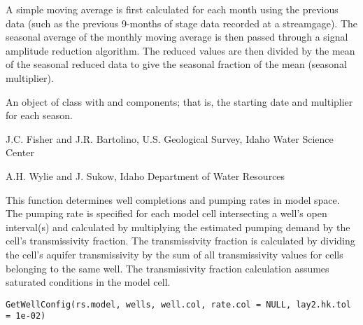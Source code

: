 \documentclass[a4paper]{book}
\begin{document}
%
\begin{Details}\relax
A simple moving average is first calculated for each month using the previous data (such as the previous 9-months of stage data recorded at a streamgage).
The seasonal average of the monthly moving average is then passed through a signal amplitude reduction algorithm.
The reduced values are then divided by the mean of the seasonal reduced data to give the seasonal fraction of the mean (seasonal multiplier).
\end{Details}
%
\begin{Value}
An object of  class with  and  components; that is, the starting date and multiplier for each season.
\end{Value}
%
\begin{Author}\relax
J.C. Fisher and J.R. Bartolino, U.S. Geological Survey, Idaho Water Science Center

A.H. Wylie and J. Sukow, Idaho Department of Water Resources
\end{Author}
%
\begin{Examples}
\end{Examples}
%
\begin{Description}\relax
This function determines well completions and pumping rates in model space.
The pumping rate is specified for each model cell intersecting a well's open interval(s)
and calculated by multiplying the estimated pumping demand by the cell's transmissivity fraction.
The transmissivity fraction is calculated by dividing the cell's aquifer transmissivity by the sum of all transmissivity values for cells belonging to the same well.
The transmissivity fraction calculation assumes saturated conditions in the model cell.
\end{Description}
%
\begin{Usage}
\begin{verbatim}
GetWellConfig(rs.model, wells, well.col, rate.col = NULL, lay2.hk.tol = 1e-02)
\end{verbatim}
\end{Usage}
\end{document}
